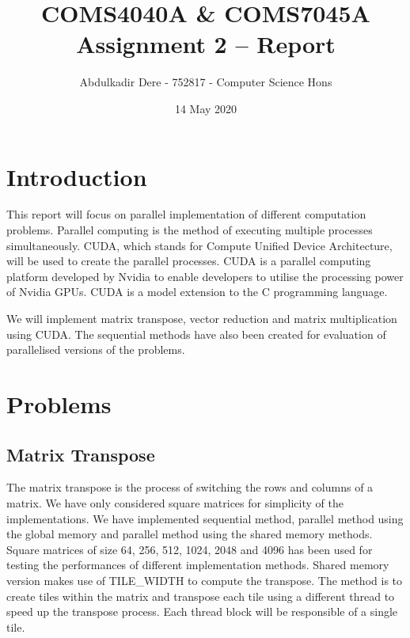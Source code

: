 

\title{COMS4040A \& COMS7045A Assignment 2 -- Report}
\author{Abdulkadir Dere - 752817 - Computer Science Hons}
\date{14 May 2020} 
\maketitle 
\pagestyle{fancy}
\fancyhf{}
\fancyhead[R]{\thepage}
\section{Introduction} 
This report will focus on parallel implementation of different computation problems. Parallel computing is the method of executing multiple processes simultaneously. CUDA, which stands for Compute Unified Device Architecture, will be used to create the parallel processes. CUDA is a parallel computing platform developed by Nvidia to enable developers to utilise the processing power of Nvidia GPUs. CUDA is a model extension to the C programming language.

We will implement matrix transpose, vector reduction and matrix multiplication using CUDA. The sequential methods have also been created for evaluation of parallelised versions of the problems.

\section{Problems} 
\subsection{Matrix Transpose}
The matrix transpose is the process of switching the rows and columns of a matrix. We have only considered square matrices for simplicity of the implementations. We have implemented sequential method, parallel method using the global memory and parallel method using the shared memory methods. Square matrices of size 64, 256, 512, 1024, 2048 and 4096 has been used for testing the performances of different implementation methods. Shared memory version makes use of TILE\_WIDTH to compute the transpose. The method is to create tiles within the matrix and transpose each tile using a different thread to speed up the transpose process. Each thread block will be responsible of a single tile. 

